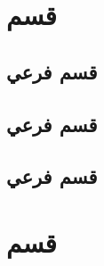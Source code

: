 \documentclass[a8paper]{report}
\begin{document}
\section{قسم}
\subsection{قسم فرعي}
\subsection{قسم فرعي}
\subsection{قسم فرعي}
\section{قسم}
\end{document}
